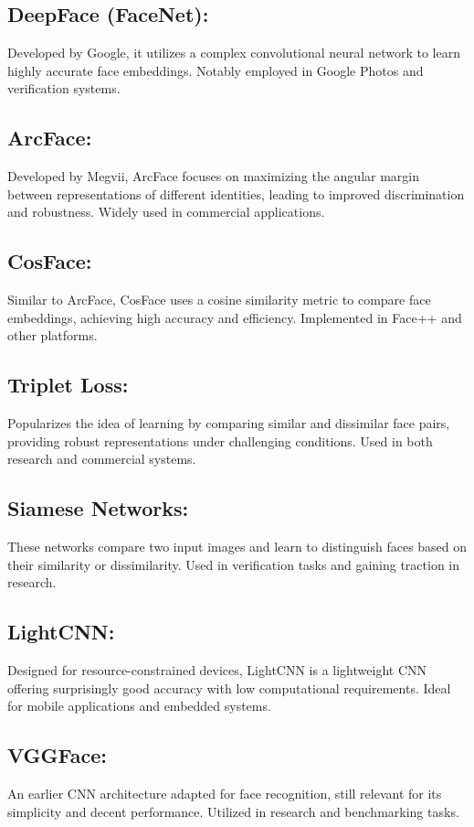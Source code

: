 \documentclass[11pt]{article}
\begin{document}
\subsection{DeepFace (FaceNet):}
Developed by Google, it utilizes a complex convolutional neural network to learn highly accurate face embeddings. Notably employed in Google Photos and verification systems.

\subsection{ArcFace:}
Developed by Megvii, ArcFace focuses on maximizing the angular margin between representations of different identities, leading to improved discrimination and robustness. Widely used in commercial applications.

\subsection{CosFace:}
Similar to ArcFace, CosFace uses a cosine similarity metric to compare face embeddings, achieving high accuracy and efficiency. Implemented in Face++ and other platforms.

\subsection{Triplet Loss:}
Popularizes the idea of learning by comparing similar and dissimilar face pairs, providing robust representations under challenging conditions. Used in both research and commercial systems.

\subsection{Siamese Networks:}
These networks compare two input images and learn to distinguish faces based on their similarity or dissimilarity. Used in verification tasks and gaining traction in research.

\subsection{LightCNN:}
Designed for resource-constrained devices, LightCNN is a lightweight CNN offering surprisingly good accuracy with low computational requirements. Ideal for mobile applications and embedded systems.

\subsection{VGGFace:}
An earlier CNN architecture adapted for face recognition, still relevant for its simplicity and decent performance. Utilized in research and benchmarking tasks.
\end{document}
